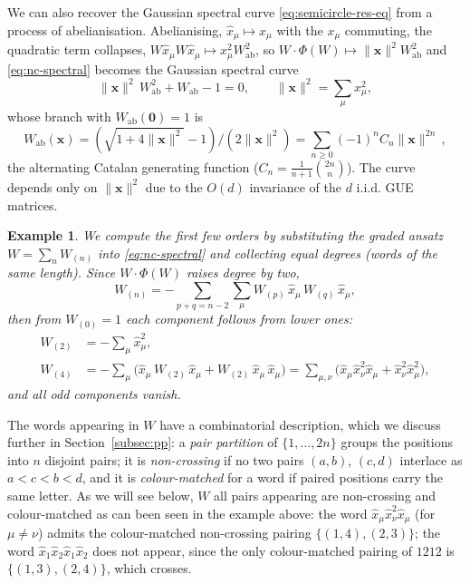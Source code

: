 \documentclass[11pt,a4paper]{article}
\newtheorem{example}[theorem]{Example}
\newcommand{\xh}{\hat{x}}
\begin{document}
We can also recover the Gaussian spectral curve \eqref{eq:semicircle-res-eq} from a process of abelianisation. Abelianising, $\xh_\mu\mapsto x_\mu$ with the $x_\mu$ commuting, the quadratic term collapses, $W\xh_\mu W\xh_\mu\mapsto x_\mu^2 W_{\mathrm{ab}}^2$, so $W\cdot\Phi(W)\mapsto\|\mathbf{x}\|^2W_{\mathrm{ab}}^2$ and \eqref{eq:nc-spectral} becomes the Gaussian spectral curve 
\begin{equation}\label{eq:curve}
  \|\mathbf{x}\|^2\,W_{\mathrm{ab}}^2 + W_{\mathrm{ab}} - 1 = 0,   \qquad \|\mathbf{x}\|^2=\textstyle\sum_\mu x_\mu^2,
\end{equation}
whose branch with $W_{\mathrm{ab}}(\mathbf 0)=1$ is
%
\begin{equation}
 W_{\mathrm{ab}}(\mathbf{x}) = (\sqrt{1+4\|\mathbf{x}\|^2}-1)/(2\|\mathbf{x}\|^2) = \sum_{n\geq0}(-1)^nC_n\|\mathbf{x}\|^{2n}\,,
\end{equation}
%
the alternating Catalan generating function ($C_n=\tfrac{1}{n+1}\binom{2n}{n}$). The curve depends only on $\|\mathbf{x}\|^2$ due to the $O(d)$ invariance of the $d$ i.i.d. GUE matrices.







\begin{example}\label{ex:picard}
We compute the first few orders by substituting the graded ansatz $W=\sum_n W_{(n)}$ into \eqref{eq:nc-spectral} and collecting equal degrees (words of the same length). Since $W\cdot\Phi(W)$ raises degree by two,
\begin{equation}
  W_{(n)} = -\sum_{p+q=n-2}\sum_{\mu} W_{(p)}\,\xh_\mu\,W_{(q)}\,\xh_\mu,
\end{equation}
then from $W_{(0)}=1$ each component follows from lower ones:
\begin{align}
  W_{(2)} &= -\sum_\mu \xh_\mu^2, \\
  W_{(4)} &= -\sum_{\mu}\bigl(\xh_\mu\,W_{(2)}\,\xh_\mu        + W_{(2)}\,\xh_\mu\,\xh_\mu\bigr) = \sum_{\mu,\nu}\bigl(\xh_\mu\xh_\nu^2\xh_\mu    + \xh_\nu^2\xh_\mu^2\bigr),
\end{align}
and all odd components vanish. 
\end{example}
%
The words appearing in $W$ have a combinatorial description, which we discuss further in Section~\ref{subsec:pp}: a \emph{pair partition} of $\{1,\ldots,2n\}$ groups the positions into $n$ disjoint pairs; it is \emph{non-crossing} if no two pairs $(a,b)$, $(c,d)$ interlace as $a<c<b<d$, and it is \emph{colour-matched} for a word if paired positions carry the same letter. As we will see below, $W$ all pairs appearing are non-crossing and colour-matched as can been seen in the example above: the word $\xh_\mu\xh_\nu^2\xh_\mu$ (for $\mu\neq\nu$) admits the colour-matched non-crossing pairing $\{(1,4),(2,3)\}$; the word $\xh_1\xh_2\xh_1\xh_2$ does not appear, since the only colour-matched pairing of $1212$ is $\{(1,3),(2,4)\}$, which crosses.
\end{document}
